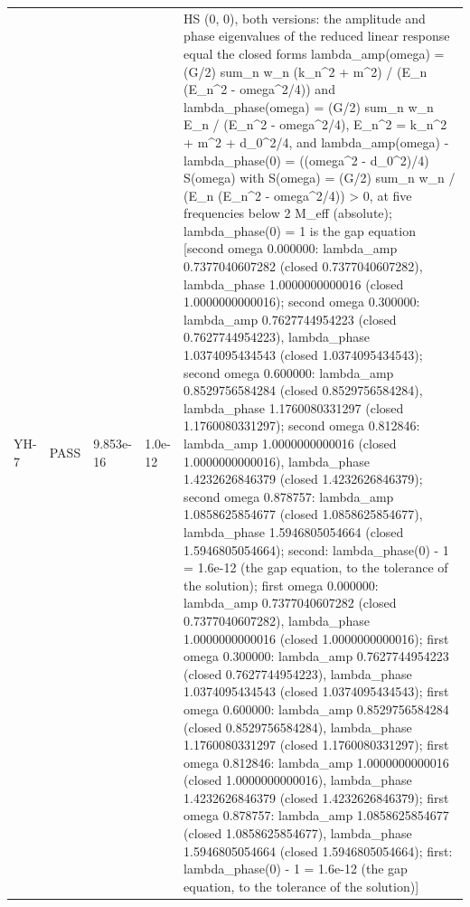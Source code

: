 \documentclass[aps,prd,onecolumn,superscriptaddress,nofootinbib,floatfix,longbibliography]{revtex4-2}
\begin{document}
\begin{longtable}{p{}p{}p{}p{}p{}}
YH-7 & PASS & 9.853e-16 & 1.0e-12 & HS (0, 0), both versions: the amplitude and phase eigenvalues of the reduced linear response equal the closed forms lambda\_amp(omega) = (G/2) sum\_n w\_n (k\_n\textasciicircum{}2 + m\textasciicircum{}2) / (E\_n (E\_n\textasciicircum{}2 - omega\textasciicircum{}2/4)) and lambda\_phase(omega) = (G/2) sum\_n w\_n E\_n / (E\_n\textasciicircum{}2 - omega\textasciicircum{}2/4), E\_n\textasciicircum{}2 = k\_n\textasciicircum{}2 + m\textasciicircum{}2 + d\_0\textasciicircum{}2/4, and lambda\_amp(omega) - lambda\_phase(0) = ((omega\textasciicircum{}2 - d\_0\textasciicircum{}2)/4) S(omega) with S(omega) = (G/2) sum\_n w\_n / (E\_n (E\_n\textasciicircum{}2 - omega\textasciicircum{}2/4)) \textgreater{} 0, at five frequencies below 2 M\_eff (absolute); lambda\_phase(0) = 1 is the gap equation [second omega 0.000000: lambda\_amp 0.7377040607282 (closed 0.7377040607282), lambda\_phase 1.0000000000016 (closed 1.0000000000016); second omega 0.300000: lambda\_amp 0.7627744954223 (closed 0.7627744954223), lambda\_phase 1.0374095434543 (closed 1.0374095434543); second omega 0.600000: lambda\_amp 0.8529756584284 (closed 0.8529756584284), lambda\_phase 1.1760080331297 (closed 1.1760080331297); second omega 0.812846: lambda\_amp 1.0000000000016 (closed 1.0000000000016), lambda\_phase 1.4232626846379 (closed 1.4232626846379); second omega 0.878757: lambda\_amp 1.0858625854677 (closed 1.0858625854677), lambda\_phase 1.5946805054664 (closed 1.5946805054664); second: lambda\_phase(0) - 1 = 1.6e-12 (the gap equation, to the tolerance of the solution); first omega 0.000000: lambda\_amp 0.7377040607282 (closed 0.7377040607282), lambda\_phase 1.0000000000016 (closed 1.0000000000016); first omega 0.300000: lambda\_amp 0.7627744954223 (closed 0.7627744954223), lambda\_phase 1.0374095434543 (closed 1.0374095434543); first omega 0.600000: lambda\_amp 0.8529756584284 (closed 0.8529756584284), lambda\_phase 1.1760080331297 (closed 1.1760080331297); first omega 0.812846: lambda\_amp 1.0000000000016 (closed 1.0000000000016), lambda\_phase 1.4232626846379 (closed 1.4232626846379); first omega 0.878757: lambda\_amp 1.0858625854677 (closed 1.0858625854677), lambda\_phase 1.5946805054664 (closed 1.5946805054664); first: lambda\_phase(0) - 1 = 1.6e-12 (the gap equation, to the tolerance of the solution)] \\

\end{longtable}
\end{document}
